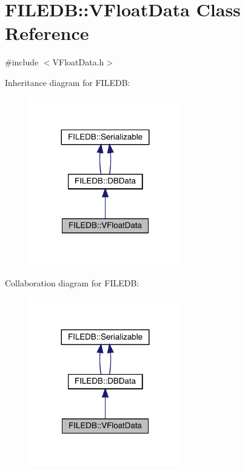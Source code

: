\hypertarget{classFILEDB_1_1VFloatData}{}\section{F\+I\+L\+E\+DB\+:\+:V\+Float\+Data Class Reference}
\label{classFILEDB_1_1VFloatData}


{\ttfamily \#include $<$V\+Float\+Data.\+h$>$}



Inheritance diagram for F\+I\+L\+E\+DB\+:\nopagebreak
\begin{figure}[H]
\begin{center}
\leavevmode
\includegraphics[width=188pt]{d3/d86/classFILEDB_1_1VFloatData__inherit__graph}
\end{center}
\end{figure}


Collaboration diagram for F\+I\+L\+E\+DB\+:\nopagebreak
\begin{figure}[H]
\begin{center}
\leavevmode
\includegraphics[width=188pt]{d8/d08/classFILEDB_1_1VFloatData__coll__graph}
\end{center}
\end{figure}
